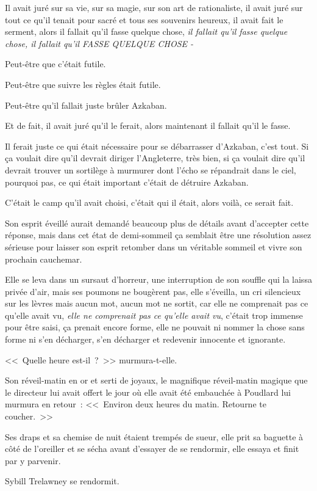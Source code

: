 Il avait juré sur sa vie, sur sa magie, sur son art de rationaliste, il avait juré sur tout ce qu'il tenait pour sacré et tous ses souvenirs heureux, il avait fait le serment, alors il fallait qu'il fasse quelque chose, \emph{il fallait qu'il fasse quelque chose, il fallait qu'il FASSE QUELQUE CHOSE -}

Peut-être que c'était futile.

Peut-être que suivre les règles était futile.

Peut-être qu'il fallait juste brûler Azkaban.

Et de fait, il avait juré qu'il le ferait, alors maintenant il fallait qu'il le fasse.

Il ferait juste ce qui était nécessaire pour se débarrasser d'Azkaban, c'est tout. Si ça voulait dire qu'il devrait diriger l'Angleterre, très bien, si ça voulait dire qu'il devrait trouver un sortilège à murmurer dont l'écho se répandrait dans le ciel, pourquoi pas, ce qui était important c'était de détruire Azkaban.

C'était le camp qu'il avait choisi, c'était qui il était, alors voilà, ce serait fait.

Son esprit éveillé aurait demandé beaucoup plus de détails avant d'accepter cette réponse, mais dans cet état de demi-sommeil ça semblait être une résolution assez sérieuse pour laisser son esprit retomber dans un véritable sommeil et vivre son prochain cauchemar.


Elle se leva dans un sursaut d'horreur, une interruption de son souffle qui la laissa privée d'air, mais ses poumons ne bougèrent pas, elle s'éveilla, un cri silencieux sur les lèvres mais aucun mot, aucun mot ne sortit, car elle ne comprenait pas ce qu'elle avait vu, \emph{elle ne comprenait pas ce qu'elle avait vu}, c'était trop immense pour être saisi, ça prenait encore forme, elle ne pouvait ni nommer la chose sans forme ni s'en décharger, s'en décharger et redevenir innocente et ignorante.

<<~Quelle heure est-il~?~>> murmura-t-elle.

Son réveil-matin en or et serti de joyaux, le magnifique réveil-matin magique que le directeur lui avait offert le jour où elle avait été embauchée à Poudlard lui murmura en retour~: <<~Environ deux heures du matin. Retourne te coucher.~>>

Ses draps et sa chemise de nuit étaient trempés de sueur, elle prit sa baguette à côté de l'oreiller et se sécha avant d'essayer de se rendormir, elle essaya et finit par y parvenir.

Sybill Trelawney se rendormit.
